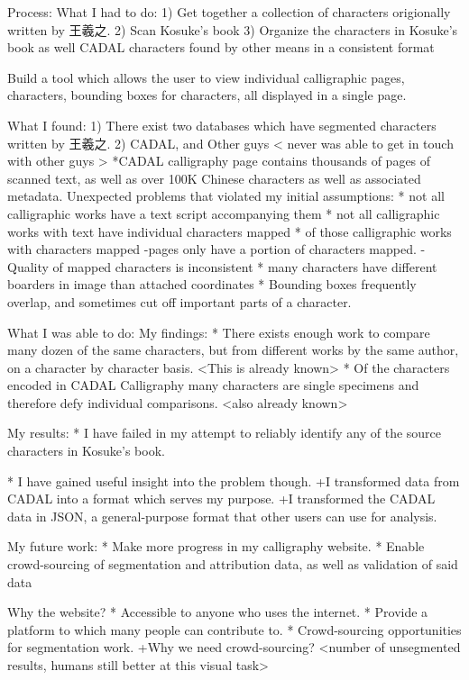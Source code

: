 Process:  What I had to do:
    1)  Get together a collection of characters origionally written by 王羲之.
    2)  Scan Kosuke's book
    3)  Organize the characters in Kosuke's book as well CADAL characters found by other means in a consistent format
    
        Build a tool which allows the user to view individual calligraphic pages, characters, bounding boxes for characters, all displayed in a single page.
    
What I found:
    1)  There exist two databases which have segmented characters written by 王羲之.
    2)  CADAL, and Other guys < never was able to get in touch with other guys >
        *CADAL calligraphy page contains thousands of pages of scanned text, as well as over 100K Chinese characters as well as associated metadata.
    Unexpected problems that violated my initial assumptions:
        * not all calligraphic works have a text script accompanying them
        * not all calligraphic works with text have individual characters mapped
        * of those calligraphic works with characters mapped
            -pages only have a portion of characters mapped.
            -Quality of mapped characters is inconsistent
                * many characters have different boarders in image than attached coordinates
                * Bounding boxes frequently overlap, and sometimes cut off important parts of a character.

What I was able to do:
    My findings:
        * There exists enough work to compare many dozen of the same characters, but from different works by the same author, on a character by character basis. <This is already known>
        *  Of the characters encoded in CADAL Calligraphy many characters are single specimens and therefore defy individual comparisons.  <also already known>
    
    My results:
        *  I have failed in my attempt to reliably identify any of the source characters in Kosuke's book.
        
        *  I have gained useful insight into the problem though.
            +I transformed data from CADAL into a format which serves my purpose.
            +I transformed the CADAL data in JSON, a general-purpose format that other users can use for analysis.
            
    My future work:
        *  Make more progress in my calligraphy website.
        *  Enable crowd-sourcing of segmentation and attribution data, as well as validation of said data


Why the website?
    * Accessible to anyone who uses the internet.
    * Provide  a platform to which many people can contribute to.
    * Crowd-sourcing opportunities for segmentation work.
        +Why we need crowd-sourcing? <number of unsegmented results, humans still better at this visual task>


